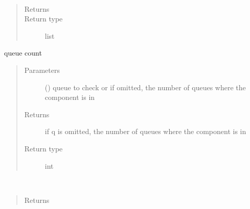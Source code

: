\documentclass[letterpaper,10pt,english]{sphinxmanual}
\begin{document}
\begin{fulllineitems}
\begin{fulllineitems}
\end{fulllineitems}


\begin{fulllineitems}
\label{\detokenize{Reference:salabim.Component.claimed_resources}}~\begin{quote}\begin{description}
\item[{Returns}] \leavevmode
{}

\item[{Return type}] \leavevmode
list

\end{description}\end{quote}

\end{fulllineitems}


\begin{fulllineitems}
\label{\detokenize{Reference:salabim.Component.count}}
queue count
\begin{quote}\begin{description}
\item[{Parameters}] \leavevmode
{} ({\hyperref[\detokenize{Reference:salabim.Queue}]{}}) \textendash{} queue to check or 
if omitted, the number of queues where the component is in

\item[{Returns}] \leavevmode
{} \textendash{} 
if q is omitted, the number of queues where the component is in

\item[{Return type}] \leavevmode
int

\end{description}\end{quote}

\end{fulllineitems}


\begin{fulllineitems}
\label{\detokenize{Reference:salabim.Component.creation_time}}~\begin{quote}\begin{description}
\item[{Returns}] \leavevmode
{}


\end{description}
\end{quote}
\end{fulllineitems}
\end{fulllineitems}
\end{document}
